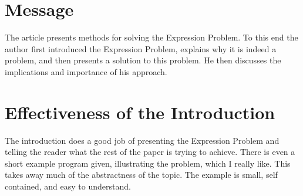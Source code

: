 \documentclass[12pt, a4paper]{article}
\begin{document}
\section{Message}
The article presents methods for solving the Expression Problem. To this end the author first introduced the Expression Problem, explains why it is indeed a problem, and then presents a solution to this problem. He then discusses the implications and importance of his approach.

\section{Effectiveness of the Introduction}
The introduction does a good job of presenting the Expression Problem and telling the reader what the rest of the paper is trying to achieve. There is even a short example program given, illustrating the problem, which I really like. This takes away much of the abstractness of the topic. The example is small, self contained, and easy to understand.
\end{document}
